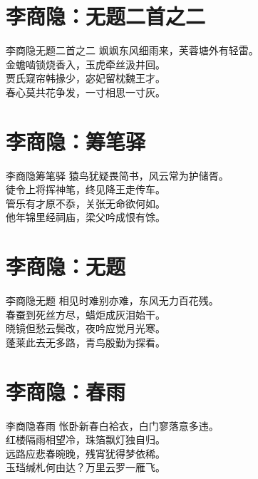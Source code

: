 \documentclass[12pt,oneside,a5paper]{book}
\begin{document}
\chapter{李商隐：无题二首之二}
\begin{poemzh}{李商隐}{无题二首之二}
飒飒东风细雨来，芙蓉塘外有轻雷。\\
金蟾啮锁烧香入，玉虎牵丝汲井回。\\
贾氏窥帘韩掾少，宓妃留枕魏王才。\\
春心莫共花争发，一寸相思一寸灰。\\ 
\end{poemzh}

\chapter{李商隐：筹笔驿}
\begin{poemzh}{李商隐}{筹笔驿}
猿鸟犹疑畏简书，风云常为护储胥。\\
徒令上将挥神笔，终见降王走传车。\\
管乐有才原不忝，关张无命欲何如。\\
他年锦里经祠庙，梁父吟成恨有馀。\\ 
\end{poemzh}

\chapter{李商隐：无题}
\begin{poemzh}{李商隐}{无题}
相见时难别亦难，东风无力百花残。\\
春蚕到死丝方尽，蜡炬成灰泪始干。\\
晓镜但愁云鬓改，夜吟应觉月光寒。\\
蓬莱此去无多路，青鸟殷勤为探看。\\ 
\end{poemzh}

\chapter{李商隐：春雨}
\begin{poemzh}{李商隐}{春雨}
怅卧新春白袷衣，白门寥落意多违。\\
红楼隔雨相望冷，珠箔飘灯独自归。\\
远路应悲春晼晚，残宵犹得梦依稀。\\
玉珰缄札何由达？万里云罗一雁飞。\\ 
\end{poemzh}
\end{document}
